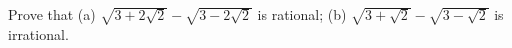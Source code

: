 Prove that (a) $\sqrt{3+2\sqrt2}-\sqrt{3-2\sqrt2}$ is rational; (b) $\sqrt{3+\sqrt2}-\sqrt{3-\sqrt2}$ is irrational.
